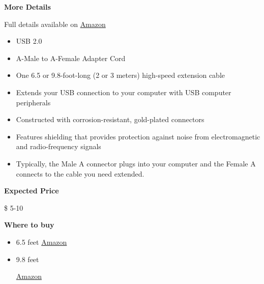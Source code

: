 \begin{gram}
\label{grm:equipment::accessories::usbextend}
\textbf{More Details}

Full details available on \href{https://www.amazon.com/AmazonBasics-Extension-Cable-Male-Female/dp/B00NH11PEY/ref=sr_1_3?crid=37GCZPQHYO54W&keywords=usb+extension+cable&qid=1582900847&s=electronics&sprefix=usb+ext,electronics,164&sr=1-3}{Amazon}

\begin{itemize}
\item USB 2.0
\item A-Male to A-Female Adapter Cord
\item  One 6.5 or 9.8-foot-long (2 or 3 meters) high-speed extension cable
\item Extends your USB connection to your computer with USB computer peripherals
\item 
Constructed with corrosion-resistant, gold-plated connectors
\item Features shielding that provides protection against noise from electromagnetic and radio-frequency signals
\item Typically, the Male A connector plugs into your computer and the Female A connects to the cable you need extended. 

\end{itemize}

\textbf{Expected Price}

\$ 5-10

\textbf{Where to buy}

\begin{itemize}
\item 
6.5 feet
\href{https://www.amazon.com/AmazonBasics-Extension-Cable-Male-Female/dp/B00NH136G}{Amazon}

\item
9.8 feet

\href{https://www.amazon.com/AmazonBasics-Extension-Cable-Male-Female/dp/B00NH11PEY/ref=sr_1_3?crid=37GCZPQHYO54W&keywords=usb+extension+cable&qid=1582900847&s=electronics&sprefix=usb+ext,electronics,164&sr=1-3}{Amazon}
\end{itemize}
\end{gram}
